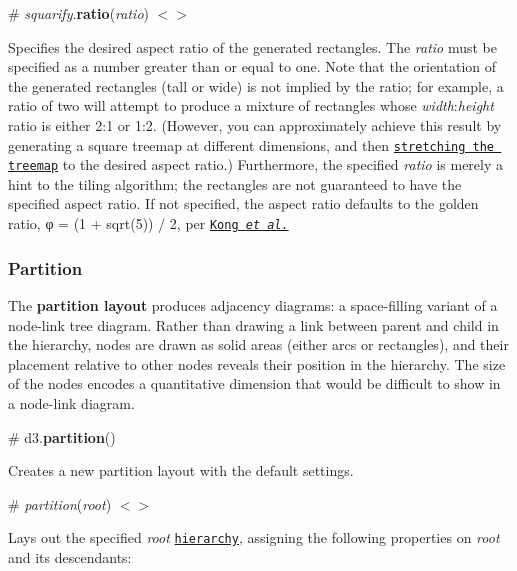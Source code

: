 \label{_squarify_ratio}%
\# {\itshape squarify}.{\bfseries ratio}({\itshape ratio}) \href{https://github.com/d3/d3-hierarchy/blob/master/src/treemap/squarify.js#L58}{\tt $<$$>$}

Specifies the desired aspect ratio of the generated rectangles. The {\itshape ratio} must be specified as a number greater than or equal to one. Note that the orientation of the generated rectangles (tall or wide) is not implied by the ratio; for example, a ratio of two will attempt to produce a mixture of rectangles whose {\itshape width}\+:{\itshape height} ratio is either 2\+:1 or 1\+:2. (However, you can approximately achieve this result by generating a square treemap at different dimensions, and then \href{http://bl.ocks.org/mbostock/5c50a377e76a1974248bd628befdec95}{\tt stretching the treemap} to the desired aspect ratio.) Furthermore, the specified {\itshape ratio} is merely a hint to the tiling algorithm; the rectangles are not guaranteed to have the specified aspect ratio. If not specified, the aspect ratio defaults to the golden ratio, φ = (1 + sqrt(5)) / 2, per \href{http://vis.stanford.edu/papers/perception-treemaps}{\tt Kong {\itshape et al.}}

\subsubsection*{Partition}

\href{http://bl.ocks.org/mbostock/2e73ec84221cb9773f4c}{\tt }

The {\bfseries partition layout} produces adjacency diagrams\+: a space-\/filling variant of a node-\/link tree diagram. Rather than drawing a link between parent and child in the hierarchy, nodes are drawn as solid areas (either arcs or rectangles), and their placement relative to other nodes reveals their position in the hierarchy. The size of the nodes encodes a quantitative dimension that would be difficult to show in a node-\/link diagram.

\label{_partition}%
\# d3.{\bfseries partition}()

Creates a new partition layout with the default settings.

\label{__partition}%
\# {\itshape partition}({\itshape root}) \href{https://github.com/d3/d3-hierarchy/blob/master/src/partition.js#L10}{\tt $<$$>$}

Lays out the specified {\itshape root} \href{#hierarchy}{\tt hierarchy}, assigning the following properties on {\itshape root} and its descendants\+:



